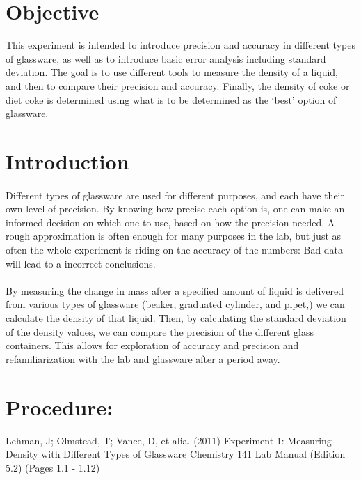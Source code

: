 \documentclass[11pt,letterpaper]{report}
\begin{document}


\section*{Objective} 
This experiment is intended to introduce precision and accuracy in different types of glassware, as well as to introduce basic error analysis including standard deviation. The goal is to use different tools to measure the density of a liquid, and then to compare their precision and accuracy. Finally, the density of coke or diet coke is determined using what is to be determined as the `best' option of glassware.

\section*{Introduction}
\paragraph*{}
Different types of glassware are used for different purposes, and each have their own level of precision. By knowing how precise each option is, one can make an informed decision on which one to use, based on how the precision needed. A rough approximation is often enough for many purposes in the lab, but just as often the whole experiment is riding on the accuracy of the numbers: Bad data will lead to a incorrect conclusions.

\paragraph*{}
By measuring the change in mass after a specified amount of liquid is delivered from various types of glassware (beaker, graduated cylinder, and pipet,)  we can calculate the density of that liquid. Then, by calculating the standard deviation of the density values, we can compare the precision of the different glass containers. This allows for exploration of accuracy and precision and refamiliarization with the lab and glassware after a period away.


\section*{Procedure:}
Lehman, J; Olmstead, T; Vance, D, et alia. (2011)
Experiment 1: Measuring Density with Different Types of Glassware
Chemistry 141 Lab Manual (Edition 5.2) (Pages 1.1 - 1.12)
\end{document}
